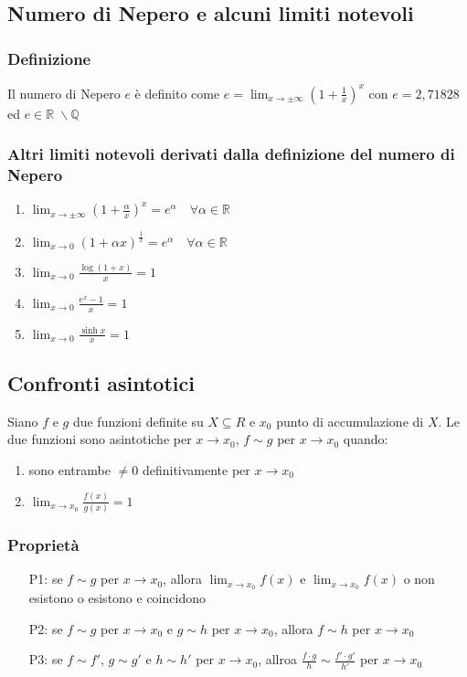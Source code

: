 \documentclass[a4paper]{article}
\begin{document}
\subsection{Numero di Nepero e alcuni limiti notevoli}
\subsubsection*{Definizione}
Il numero di Nepero \(e\) è definito come \(\displaystyle e = \lim_{x \to \pm \infty} \left( 1 + \frac{1}{x} \right) ^ x\)
con \(e = 2,71828\) ed \(e \in \mathbb{R} \; \backslash \mathbb{Q}\)

\subsubsection*{Altri limiti notevoli derivati dalla definizione del numero di Nepero}
\begin{enumerate}
	\item \(\displaystyle \lim_{x \to \pm \infty} \left(1 + \frac{\alpha}{x} \right) ^ x = e ^ \alpha \quad \forall \alpha \in \mathbb{R}\)
	\item \(\displaystyle \lim_{x \to 0} \left( 1 + \alpha x \right) ^ \frac{1}{x} = e ^ \alpha \quad \forall \alpha \in \mathbb{R}\)
	\item \(\displaystyle \lim_{x \to 0} \frac{\log \left( 1 + x \right)}{x} = 1\)
	\item \(\displaystyle \lim_{x \to 0} \frac{ e ^ x - 1 }{x} = 1\)
	\item \(\displaystyle \lim_{x \to 0} \frac{\sinh x}{x} = 1\)
\end{enumerate}

\subsection{Confronti asintotici}
Siano \(f\) e \(g\) due funzioni definite su \(X \subseteq R\) e \(x_0\) punto di accumulazione di \(X\). Le due funzioni sono asintotiche per \(x \to x_0\),
\(f \sim g\) per \(x \to x_0\) quando:
\begin{enumerate}
	\item sono entrambe \(\neq 0\) definitivamente per \(x \to x_0\)
	\item \(\displaystyle \lim_{x \to x_0} \frac{f(x)}{g(x)} = 1\)
\end{enumerate}

\subsubsection*{Proprietà}
\begin{itemize}
	\item[P1:] se \(f \sim g\) per \(x \to x_0\), allora \(\lim_{x \to x_0} f(x)\) e \(\lim_{x \to x_0} f(x)\) o non esistono o esistono e coincidono
	\item[P2:] se \(f \sim g\) per \(x \to x_0\) e \(g \sim h\) per \(x \to x_0\), allora \(f \sim h\) per \(x \to x_0\)
	\item[P3:] se \(f \sim f'\), \(g \sim g'\) e \(h \sim h'\) per \(x \to x_0\), allroa \(\displaystyle \frac{f \cdot g}{h} \sim \frac{f' \cdot g'}{h'}\) per \(x \to x_0\)
\end{itemize}
\end{document}
